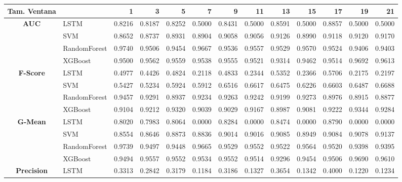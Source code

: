 \begin{table}[h]
	\centering
	\begin{adjustbox}{max width=15cm}
		\begin{tabular}{|c|l|r|r|r|r|r|r|r|r|r|r|r|}
			\hline
			\textbf{Tam. Ventana}&         &      1  &      3  &      5  &      7  &      9  &      11 &      13 &      15 &      17 &      19 &      21 \\
			\hline
			\textbf{AUC} & LSTM &  0.8216 &  0.8187 &  0.8252 &  0.5000 &  0.8431 &  0.5000 &  0.8591 &  0.5000 &  0.8857 &  0.5000 &  0.5000 \\
			& SVM &  0.8652 &  0.8737 &  0.8931 &  0.8904 &  0.9058 &  0.9056 &  0.9126 &  0.8990 &  0.9118 &  0.9120 &  0.9170 \\
			& RandomForest &  0.9740 &  0.9506 &  0.9454 &  0.9667 &  0.9536 &  0.9557 &  0.9529 &  0.9570 &  0.9524 &  0.9406 &  0.9403 \\
			& XGBoost &  0.9500 &  0.9562 &  0.9559 &  0.9538 &  0.9555 &  0.9521 &  0.9314 &  0.9462 &  0.9514 &  0.9692 &  0.9613 \\
			\hline
			\textbf{F-Score} & LSTM &  0.4977 &  0.4426 &  0.4824 &  0.2118 &  0.4833 &  0.2344 &  0.5352 &  0.2366 &  0.5706 &  0.2175 &  0.2197 \\
			& SVM &  0.5427 &  0.5234 &  0.5924 &  0.5912 &  0.6516 &  0.6617 &  0.6475 &  0.6226 &  0.6603 &  0.6487 &  0.6688 \\
			& RandomForest &  0.9457 &  0.9291 &  0.8937 &  0.9234 &  0.9263 &  0.9242 &  0.9199 &  0.9273 &  0.8976 &  0.8915 &  0.8877 \\
			& XGBoost &  0.9104 &  0.9212 &  0.9320 &  0.9039 &  0.9029 &  0.9167 &  0.8987 &  0.9081 &  0.9222 &  0.9344 &  0.9284 \\
			\hline
			\textbf{G-Mean} & LSTM &  0.8020 &  0.7983 &  0.8064 &  0.0000 &  0.8284 &  0.0000 &  0.8474 &  0.0000 &  0.8790 &  0.0000 &  0.0000 \\
			& SVM &  0.8554 &  0.8646 &  0.8873 &  0.8836 &  0.9014 &  0.9016 &  0.9085 &  0.8949 &  0.9084 &  0.9078 &  0.9137 \\
			& RandomForest &  0.9739 &  0.9497 &  0.9448 &  0.9665 &  0.9529 &  0.9552 &  0.9522 &  0.9564 &  0.9520 &  0.9398 &  0.9395 \\
			& XGBoost &  0.9494 &  0.9557 &  0.9552 &  0.9534 &  0.9552 &  0.9514 &  0.9296 &  0.9454 &  0.9506 &  0.9690 &  0.9610 \\
			\hline
			\textbf{Precision} & LSTM &  0.3313 &  0.2842 &  0.3179 &  0.1184 &  0.3186 &  0.1327 &  0.3654 &  0.1342 &  0.4000 &  0.1220 &  0.1234 \\

\end{tabular}
\end{adjustbox}
\end{table}
